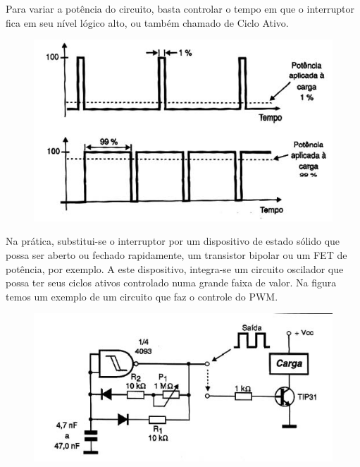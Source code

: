 Para variar a potência do circuito, basta controlar o tempo em que o interruptor fica em seu nível lógico alto, ou também chamado de Ciclo Ativo.


\FloatBarrier
\begin{figure}[!htbp]
	\centering
	\includegraphics[scale=0.7]{imagens/PWM3}
	\caption{ }%
	
	\label{fig:PWM3}
\end{figure}
\FloatBarrier


Na prática, substitui-se o interruptor por um dispositivo de estado sólido que possa ser aberto ou fechado rapidamente, um transistor bipolar ou um FET de potência, por exemplo. A este dispositivo, integra-se um circuito oscilador que possa ter seus ciclos ativos controlado numa grande faixa de valor.
Na figura temos um exemplo de um circuito que faz o controle do PWM.

\FloatBarrier
\begin{figure}[!htbp]
	\centering
	\includegraphics[scale=0.7]{imagens/PWM4}
	\caption{ }%
	
	\label{fig:PWM4}
\end{figure}
\FloatBarrier

